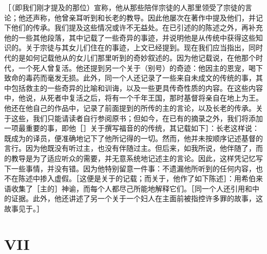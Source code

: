 ［（即我们刚才提及的那位）宣称，他从那些陪伴宗徒的人那里领受了宗徒的言论；他还声称，他曾亲耳听到和长老的教导。因此他屡次在著作中提及他们，并记下他们的传承。我们提及这些情况或许不无益处。在已引述的的陈述之外，再补充他的一些其他段落，其中记载了一些奇异的事迹，并说明他是从传统中获得这些知识的。关于宗徒与其女儿们住在的事迹，上文已经提到。现在我们应当指出，同时代的是如何记载他从的女儿们那里听到的奇妙叙述的。因为他记载说，在他那个时代，一个死人曾复活。他还提到另一个关于（别号）的奇迹：他因主的恩宠，喝下致命的毒药而毫发无损。此外，同一个人还记录了一些来自未成文的传统的事，其中包括救主的一些奇异的比喻和训诲，以及一些更具传奇性质的内容。在这些内容中，他说，从死者中复活之后，将有一个千年王国，那时基督将亲自在地上为王。他还在他自己的作品中，记录了前面提到的所传的主的言论，以及长老的传承。关于这些，我们只能请读者自行参阅原书；但如今，在已有的摘录之外，我们将添加一项最重要的事，即他［］关于撰写福音的的传统，其记载如下］：长老这样说：既成为的译员，便准确地记下了他所记得的一切。然而，他并未按顺序记述基督的言行。因为他既没有听过主，也没有伴随过主。但后来，如我所说，他伴随了，而的教导是为了适应听众的需要，并无意系统地记述主的言论。因此，这样凭记忆写下一些事情，并没有错。因为他特别留意一件事：不遗漏他所听到的任何内容，也不在陈述中掺入虚假。［这便是关于的记载；而关于，他作了如下陈述］：用希伯来语收集了［主的］神谕，而每个人都尽己所能地解释它们。［同一个人还引用和中的证据。此外，他还讲述了另一个关于一个妇人在主面前被指控许多罪的故事，这故事见于。］\par


\section{VII}

\par


